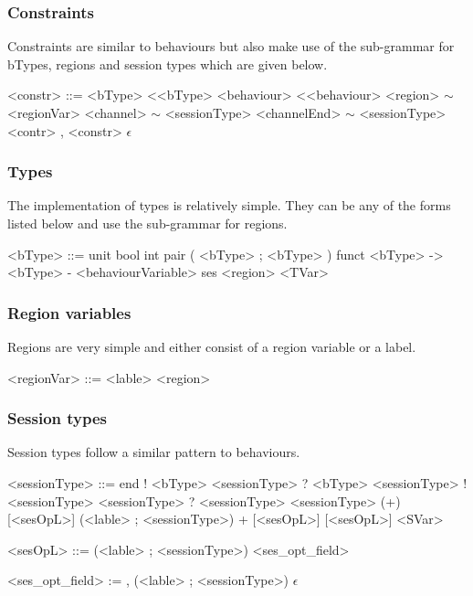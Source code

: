 \subsubsection{Constraints}

Constraints are similar to behaviours but also make use of the sub-grammar for bTypes, regions and session types which are given below. 

\begin{grammar}

<constr> ::= <bType> \textless <bType>
\alt <behaviour> \textless <behaviour>
\alt <region> $\sim$ <regionVar>
\alt <channel> $\sim$ <sessionType>
\alt <channelEnd> $\sim$ <sessionType>
\alt <contr> , <constr>
\alt $\epsilon$

\end{grammar}

\subsubsection{Types}

The implementation of types is relatively simple. They can be any of the forms listed below and use the sub-grammar for regions. 
\begin{grammar}

<bType> ::= unit
\alt bool 
\alt int
\alt pair ( <bType> ; <bType> )
\alt funct <bType> -\textgreater <bType> - <behaviourVariable>
\alt ses <region>
\alt <TVar>

\end{grammar}

\subsubsection {Region variables}

Regions are very simple and either consist of a region variable or a label. 

\begin{grammar}

<regionVar> ::= <lable>
\alt <region>

\end{grammar}

\subsubsection{Session types}

Session types follow a similar pattern to behaviours.

\begin{grammar}

<sessionType> ::= end
\alt ! <bType> <sessionType>
\alt ? <bType> <sessionType>
\alt ! <sessionType> <sessionType>
\alt ? <sessionType> <sessionType>
\alt (+) [<sesOpL>] (<lable> ; <sessionType>)
\alt + [<sesOpL>] [<sesOpL>]
\alt <SVar>

<sesOpL> ::= (<lable> ; <sessionType>) <ses_opt_field>

<ses_opt_field> := , (<lable> ; <sessionType>)
\alt $\epsilon$

\end{grammar}

